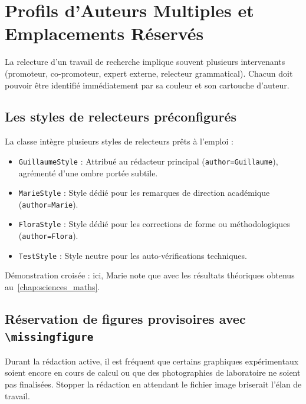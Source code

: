 \section{Profils d'Auteurs Multiples et Emplacements Réservés}
\label{sec:profils_relecteurs}

La relecture d'un travail de recherche implique souvent plusieurs intervenants (promoteur, co-promoteur, expert externe, relecteur grammatical).
Chacun doit pouvoir être identifié immédiatement par sa couleur et son cartouche d'auteur.

\subsection{Les styles de relecteurs préconfigurés}
\label{subsec:styles_relecteurs_preconfig}

La classe intègre plusieurs styles de relecteurs prêts à l'emploi :
\begin{itemize}
  \item \texttt{GuillaumeStyle} : Attribué au rédacteur principal (\texttt{author=Guillaume}), agrémenté d'une ombre portée subtile.
  \item \texttt{MarieStyle} : Style dédié pour les remarques de direction académique (\texttt{author=Marie}).
  \item \texttt{FloraStyle} : Style dédié pour les corrections de forme ou méthodologiques (\texttt{author=Flora}).
  \item \texttt{TestStyle} : Style neutre pour les auto-vérifications techniques.
\end{itemize}

Démonstration croisée : ici, Marie note que  avec les résultats théoriques obtenus au~\cref{chap:sciences_maths}.

\subsection{Réservation de figures provisoires avec \texttt{\textbackslash missingfigure}}
\label{subsec:missing_figures_demo}

Durant la rédaction active, il est fréquent que certains graphiques expérimentaux soient encore en cours de calcul ou que des photographies de laboratoire ne soient pas finalisées.
Stopper la rédaction en attendant le fichier image briserait l'élan de travail.

